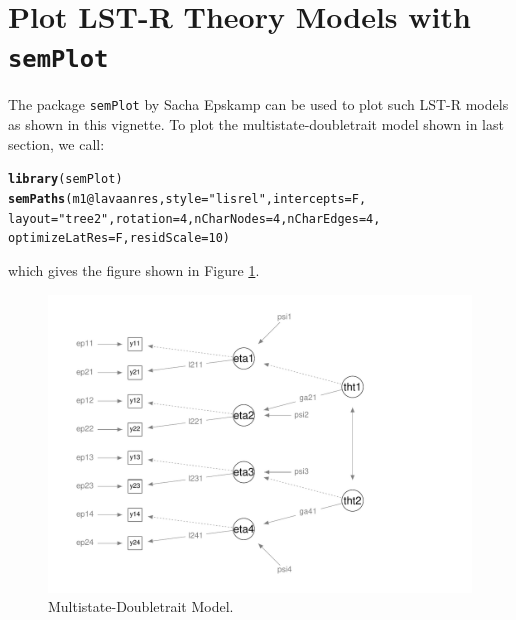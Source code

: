 \documentclass[10pt]{article}\usepackage[]{graphicx}\usepackage[]{xcolor}
\makeatletter
\newcommand{\hlnum}[1]{\textcolor[rgb]{0.686,0.059,0.569}{#1}}%
\newcommand{\hlstr}[1]{\textcolor[rgb]{0.192,0.494,0.8}{#1}}%
\newcommand{\hlopt}[1]{\textcolor[rgb]{0,0,0}{#1}}%
\newcommand{\hlstd}[1]{\textcolor[rgb]{0.345,0.345,0.345}{#1}}%
\newcommand{\hlkwc}[1]{\textcolor[rgb]{0.333,0.667,0.333}{#1}}%
\newcommand{\hlkwd}[1]{\textcolor[rgb]{0.737,0.353,0.396}{\textbf{#1}}}%
\newenvironment{kframe}{%
 \def\at@end@of@kframe{}%
 \ifinner\ifhmode%
  \def\at@end@of@kframe{\end{minipage}}%
  \begin{minipage}{\columnwidth}%
 \fi\fi%
 \def\FrameCommand##1{\hskip\@totalleftmargin \hskip-\fboxsep
 \colorbox{shadecolor}{##1}\hskip-\fboxsep
     \hskip-\linewidth \hskip-\@totalleftmargin \hskip\columnwidth}%
 \MakeFramed {\advance\hsize-\width
   \@totalleftmargin\z@ \linewidth\hsize
   \@setminipage}}%
 {\par\unskip\endMakeFramed%
 \at@end@of@kframe}
\newenvironment{knitrout}{}{} %
\makeatother
\begin{document}
\newpage

\section{Plot LST-R Theory Models with \texttt{semPlot}}

The package \texttt{semPlot} by Sacha Epskamp can be used to plot such LST-R models as shown in this vignette. To plot the multistate-doubletrait model shown in last section, we call:

%
\begin{knitrout}
\color{fgcolor}\begin{kframe}
\begin{alltt}
\hlkwd{library}\hlstd{(semPlot)}
\hlkwd{semPaths}\hlstd{(m1}\hlopt{@}\hlkwc{lavaanres}\hlstd{,} \hlkwc{style}\hlstd{=}\hlstr{"lisrel"}\hlstd{,} \hlkwc{intercepts}\hlstd{=F,}
         \hlkwc{layout}\hlstd{=}\hlstr{"tree2"}\hlstd{,} \hlkwc{rotation}\hlstd{=}\hlnum{4}\hlstd{,} \hlkwc{nCharNodes}\hlstd{=}\hlnum{4}\hlstd{,} \hlkwc{nCharEdges}\hlstd{=}\hlnum{4}\hlstd{,}
         \hlkwc{optimizeLatRes}\hlstd{=F,} \hlkwc{residScale}\hlstd{=}\hlnum{10}\hlstd{)}
\end{alltt}
\end{kframe}
\end{knitrout}
%

which gives the figure shown in Figure \ref{fig:semplot01}.

%
\begin{figure}
\centering
\includegraphics[scale=0.7]{semplot01}
\caption{Multistate-Doubletrait Model.}
\label{fig:semplot01}
\end{figure}
%           
\end{document}
